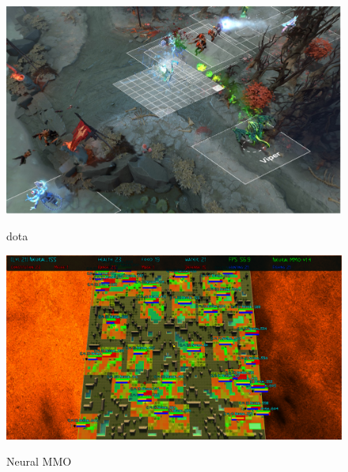 \documentclass[notheorems, aspectratio=54]{beamer}
\begin{document}
\begin{frame}
\begin{figure}[h]
  \begin{minipage}{0.3\textwidth}
    \includegraphics[width=\textwidth]{ dota.png}
    \begin{center}
    dota 
    \end{center}
  \end{minipage}
  \hspace{0.02\linewidth}
  \begin{minipage}{0.3\textwidth}
    \includegraphics[width=\textwidth]{Neural_MMO.png}
    \begin{center}
    Neural MMO 
    \end{center}
  \end{minipage}
  \end{figure}
\end{frame}
\end{document}
